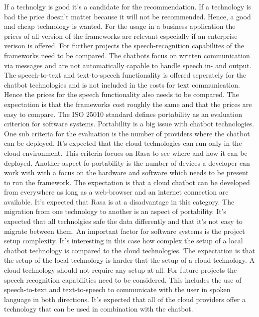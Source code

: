 If a technolgy is good it's a candidate for the recommendation.
If a technology is bad the price doesn't matter because it will not be recommended.
Hence, a good and cheap technology is wanted. 
For the usage in a business application the prices of all version of the frameworks are relevant 
especially if an enterprise verison is offered.
For further projects the speech-recognition capabilites of the frameworks need to be 
compared. 
The chatbots focus on written communication via messages and are not automatically capable 
to handle speech in- and output.
The speech-to-text and text-to-speech functionality is offered seperately for the 
chatbot technologies and is not included in the costs for text communication.
Hence the prices for the speech functionality also needs to be compared.
The expectation is that the frameworks cost roughly the same and that 
the prices are easy to compare.
The ISO 25010\cite{iso25010} standard defines portability as an evaluation criterion for software systems.
Portability is a big issue with chatbot technologies.
One sub criteria for the evaluation is the number of providers where the chatbot 
can be deployed.
It's expected that the cloud technologies can run only in the cloud environment.
This criteria focues on Rasa to see where and how it can be deployed.
Another aspect fo portability is the number of devices a developer can work with 
with a focus on the hardware and software which needs to be present to run the 
framework.
The expectation is that a cloud chatbot can be developed from everywhere 
as long as a web-browser and an internet connection are available.
It's expected that Rasa is at a disadvantage in this category.
The migration from one technology to another is an aspect of portability.
It's expected that all technolgies safe the data differently and that it's not 
easy to migrate between them.
An important factor for software systems is the project setup complexity.
It's interesting in this case how complex the setup of a local chatbot 
technology is compared to the cloud technologies.
The expectation is that the setup of the local technology is harder 
that the setup of a cloud technology.
A cloud technology should not require any setup at all.
For future projects the speech recognition capabilities need to be considered.
This includes the use of speech-to-text and text-to-speech to communicate with the user 
in spoken language in both directions.
It's expected that all of the cloud providers offer a 
technology that can be used in combination with the chatbot.
